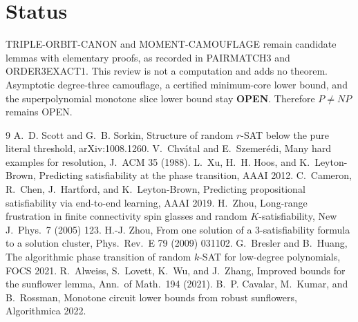 \documentclass[11pt]{article}
\begin{document}
\section{Status}
TRIPLE-ORBIT-CANON and MOMENT-CAMOUFLAGE remain candidate lemmas with elementary proofs, as recorded in PAIRMATCH3 and ORDER3EXACT1. This review is not a computation and adds no theorem. Asymptotic degree-three camouflage, a certified minimum-core lower bound, and the superpolynomial monotone slice lower bound stay \textbf{OPEN}. Therefore \(P\ne NP\) remains OPEN.

\begin{thebibliography}{9}
 A.~D. Scott and G.~B. Sorkin, Structure of random \(r\)-SAT below the pure literal threshold, arXiv:1008.1260.
 V.~Chv\'atal and E.~Szemer\'edi, Many hard examples for resolution, J.~ACM 35 (1988).
 L.~Xu, H.~H. Hoos, and K.~Leyton-Brown, Predicting satisfiability at the phase transition, AAAI 2012.
 C.~Cameron, R.~Chen, J.~Hartford, and K.~Leyton-Brown, Predicting propositional satisfiability via end-to-end learning, AAAI 2019.
 H.~Zhou, Long-range frustration in finite connectivity spin glasses and random \(K\)-satisfiability, New J.~Phys.\ 7 (2005) 123.
 H.-J. Zhou, From one solution of a 3-satisfiability formula to a solution cluster, Phys.~Rev.~E 79 (2009) 031102.
 G.~Bresler and B.~Huang, The algorithmic phase transition of random \(k\)-SAT for low-degree polynomials, FOCS 2021.
 R.~Alweiss, S.~Lovett, K.~Wu, and J.~Zhang, Improved bounds for the sunflower lemma, Ann.\ of Math.\ 194 (2021).
 B.~P. Cavalar, M.~Kumar, and B.~Rossman, Monotone circuit lower bounds from robust sunflowers, Algorithmica 2022.
\end{thebibliography}
\end{document}
